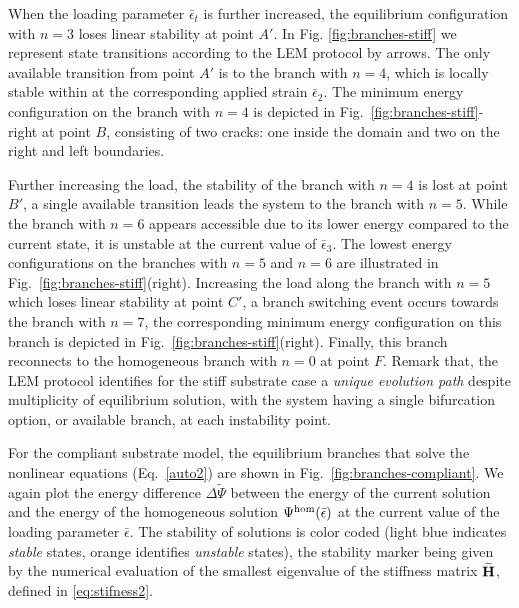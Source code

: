 \documentclass[10pt]{article}
\begin{document}
When the loading parameter $\bar{\epsilon}_t$ is further increased, the equilibrium configuration with $n=3$ loses linear stability at point $A'$. In Fig. \ref{fig:branches-stiff} we represent state transitions according to the LEM protocol by arrows. The only available transition from point $A'$ is to the branch with $n=4$, which is locally stable within at the corresponding applied strain $\bar{\epsilon}_2$. The minimum energy configuration on the branch with $n=4$ is depicted in Fig.~\ref{fig:branches-stiff}-right at point $B$, consisting of two cracks: one inside the domain and two on the right and left boundaries.

Further increasing the load, the stability of the branch with $n=4$ is lost at point $B'$, a single available transition leads the system to the branch with $n=5$. While the branch with $n=6$ appears accessible due to its lower energy compared to the current state, it is unstable at the current value of $\bar\epsilon_3$. The lowest energy configurations on the branches with $n=5$ and $n=6$ are illustrated in Fig.~\ref{fig:branches-stiff}(right). Increasing the load along the branch with $n=5$ which loses linear stability at point $C'$, a branch switching event occurs towards the branch with $n=7$, the corresponding minimum energy configuration on this branch is depicted in Fig.~\ref{fig:branches-stiff}(right). Finally, this branch reconnects to the homogeneous branch with $n=0$ at point $F$. Remark that, the LEM protocol identifies for the stiff substrate case a \emph{unique evolution path} despite  multiplicity of equilibrium solution, with the system having a single bifurcation option, or available branch, at each instability point.

For the compliant substrate model, the equilibrium branches that solve the nonlinear equations (Eq.~\ref{auto2}) are shown in Fig.~\ref{fig:branches-compliant}.
We again plot the energy difference $\Delta \widetilde\Psi$ between the energy of the current solution and the energy of the homogeneous solution $\Psi^\text{hom} (\bar{\epsilon})$ at the current value of the loading parameter $\bar\epsilon$.
The stability of solutions is color coded (light blue indicates \emph{stable} states, orange identifies \emph{unstable} states), the stability marker being given by the numerical evaluation of the smallest eigenvalue of the stiffness matrix $\widetilde{\mathbf{H}}$, defined in \eqref{eq:stifness2}.
\end{document}
